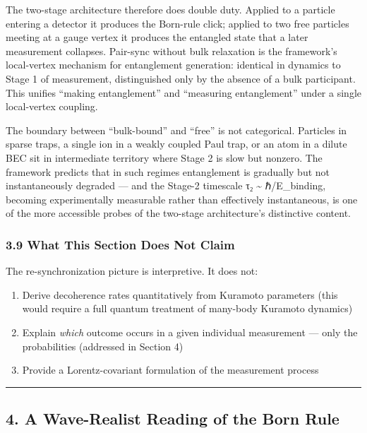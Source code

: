 \documentclass[
]{article}
\providecommand{\tightlist}{%
  \setlength{\itemsep}{0pt}\setlength{\parskip}{0pt}}
\begin{document}
The two-stage architecture therefore does double duty. Applied to a
particle entering a detector it produces the Born-rule click; applied to
two free particles meeting at a gauge vertex it produces the entangled
state that a later measurement collapses. Pair-sync without bulk
relaxation is the framework's local-vertex mechanism for entanglement
generation: identical in dynamics to Stage 1 of measurement,
distinguished only by the absence of a bulk participant. This unifies
``making entanglement'' and ``measuring entanglement'' under a single
local-vertex coupling.

The boundary between ``bulk-bound'' and ``free'' is not categorical.
Particles in sparse traps, a single ion in a weakly coupled Paul trap,
or an atom in a dilute BEC sit in intermediate territory where Stage 2
is slow but nonzero. The framework predicts that in such regimes
entanglement is gradually but not instantaneously degraded --- and the
Stage-2 timescale τ₂ \textasciitilde{} ℏ/E\_binding, becoming
experimentally measurable rather than effectively instantaneous, is one
of the more accessible probes of the two-stage architecture's
distinctive content.

\subsubsection{3.9 What This Section Does Not
Claim}\label{what-this-section-does-not-claim}

The re-synchronization picture is interpretive. It does not:

\begin{enumerate}
\def\labelenumi{\arabic{enumi}.}
\tightlist
\item
  Derive decoherence rates quantitatively from Kuramoto parameters (this
  would require a full quantum treatment of many-body Kuramoto dynamics)
\item
  Explain \emph{which} outcome occurs in a given individual measurement
  --- only the probabilities (addressed in Section 4)
\item
  Provide a Lorentz-covariant formulation of the measurement process
\end{enumerate}

\begin{center}\rule{0.5\linewidth}{0.5pt}\end{center}

\subsection{4. A Wave-Realist Reading of the Born
Rule}\label{a-wave-realist-reading-of-the-born-rule}
\end{document}
